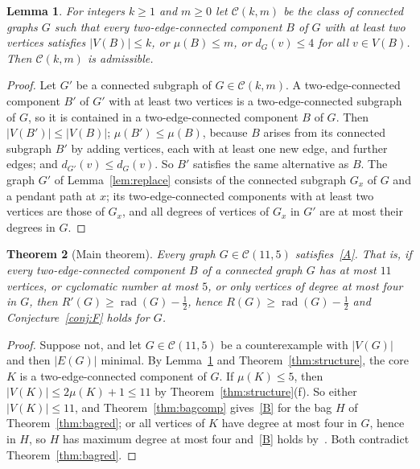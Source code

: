 \documentclass[11pt]{amsart}
\newtheorem{theorem}{Theorem}[section]
\newtheorem{lemma}[theorem]{Lemma}
\theoremstyle{definition}
\DeclareMathOperator{\rad}{rad}
\newcommand{\Rp}{R'}
\newcommand{\C}{\mathcal{C}}
\newcommand{\kmax}{11}
\newcommand{\mumax}{5}
\begin{document}
\begin{lemma}\label{lem:admissible}
For integers $k\ge1$ and $m\ge0$ let $\C(k,m)$ be the class of connected graphs $G$ such that every two-edge-connected
component $B$ of $G$ with at least two vertices satisfies $|V(B)|\le k$, or $\mu(B)\le m$, or $d_G(v)\le4$ for all
$v\in V(B)$. Then $\C(k,m)$ is admissible.
\end{lemma}

\begin{proof}
Let $G'$ be a connected subgraph of $G\in\C(k,m)$. A two-edge-connected component $B'$ of $G'$ with at least two vertices
is a two-edge-connected subgraph of $G$, so it is contained in a two-edge-connected component $B$ of $G$. Then
$|V(B')|\le|V(B)|$; $\mu(B')\le\mu(B)$, because $B$ arises from its connected subgraph $B'$ by adding vertices, each
with at least one new edge, and further edges; and $d_{G'}(v)\le d_G(v)$. So $B'$ satisfies the same alternative as $B$.
The graph $G'$ of Lemma~\ref{lem:replace} consists of the connected subgraph $G_x$ of $G$ and a pendant path at $x$; its
two-edge-connected components with at least two vertices are those of $G_x$, and all degrees of vertices of $G_x$ in $G'$
are at most their degrees in $G$.
\end{proof}

\begin{theorem}[Main theorem]\label{thm:main}
Every graph $G\in\C(\kmax,\mumax)$ satisfies~\eqref{A}. That is, if every two-edge-connected component $B$ of a connected
graph $G$ has at most $\kmax$ vertices, or cyclomatic number at most $\mumax$, or only vertices of degree at most four in
$G$, then $\Rp(G)\ge\rad(G)-\frac12$, hence $R(G)\ge\rad(G)-\frac12$ and Conjecture~\ref{conj:F} holds for $G$.
\end{theorem}

\begin{proof}
Suppose not, and let $G\in\C(\kmax,\mumax)$ be a counterexample with $|V(G)|$ and then $|E(G)|$ minimal. By
Lemma~\ref{lem:admissible} and Theorem~\ref{thm:structure}, the core $K$ is a two-edge-connected component of $G$.
If $\mu(K)\le\mumax$, then $|V(K)|\le2\mu(K)+1\le\kmax$ by Theorem~\ref{thm:structure}(f). So either
$|V(K)|\le\kmax$, and Theorem~\ref{thm:bagcomp} gives~\eqref{B} for the bag $H$ of Theorem~\ref{thm:bagred}; or all
vertices of $K$ have degree at most four in $G$, hence in $H$, so $H$ has maximum degree at most four and~\eqref{B}
holds by~\cite[Proposition~4.3]{CPS}. Both contradict Theorem~\ref{thm:bagred}.
\end{proof}
\end{document}
